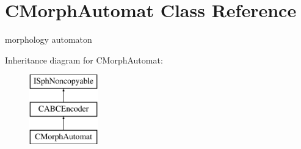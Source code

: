 \hypertarget{classCMorphAutomat}{\section{C\-Morph\-Automat Class Reference}
\label{classCMorphAutomat}
}


morphology automaton  


Inheritance diagram for C\-Morph\-Automat\-:\begin{figure}[H]
\begin{center}
\leavevmode
\includegraphics[height=3.000000cm]{classCMorphAutomat}
\end{center}
\end{figure}
